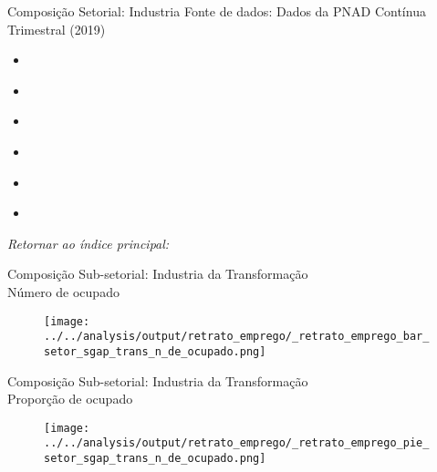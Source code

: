 \begin{frame}[label=_retrato_emprego_setor_sgap_trans]{Composição Setorial: Industria}
{\footnotesize Fonte de dados: Dados da PNAD Contínua Trimestral (2019)}

\begin{itemize}
\item{
	\hyperlink{_retrato_emprego_bar_setor_sgap_trans_n_de_ocupado}{}
	}
\item{
	\hyperlink{_retrato_emprego_pie_setor_sgap_trans_n_de_ocupado}{}
	} 
\item{
	\hyperlink{_retrato_emprego_bar_setor_sgap_trans_n_de_formal}{}
	} 
\item{
	\hyperlink{_retrato_emprego_pie_setor_sgap_trans_n_de_formal}{}
	} 
\item{
	\hyperlink{_retrato_emprego_bar_setor_sgap_trans_n_de_informal}{}
	} 	
\item{	
	\hyperlink{_retrato_emprego_pie_setor_sgap_trans_n_de_informal}{}
	} 		

\end{itemize}
\begin{small}
\textit{Retornar ao índice principal: \hyperlink{indice_principal}{} }
\end{small}
\end{frame}


\begin{frame}[label=_retrato_emprego_bar_setor_sgap_trans_n_de_ocupado]{{\small Composição Sub-setorial: Industria da Transformação} \\  Número de ocupado}
\textit{\hyperlink{_retrato_emprego_setor_sgap_trans}{}}
\begin{figure}
  \centering
  \texttt{[image: ../../analysis/output/retrato\_emprego/\_retrato\_emprego\_bar\_setor\_sgap\_trans\_n\_de\_ocupado.png]}
  \caption{}
  \label{fig:_retrato_emprego_bar_setor_sgap_trans_n_de_ocupado}
\end{figure}
\end{frame}


\begin{frame}[label=_retrato_emprego_pie_setor_sgap_trans_n_de_ocupado]{{\small Composição Sub-setorial: Industria da Transformação} \\  Proporção de ocupado}
\textit{\hyperlink{_retrato_emprego_setor_sgap_trans}{}}
\begin{figure}
  \centering
  \texttt{[image: ../../analysis/output/retrato\_emprego/\_retrato\_emprego\_pie\_setor\_sgap\_trans\_n\_de\_ocupado.png]}
  \caption{}
  \label{fig:_retrato_emprego_pie_setor_sgap_trans_n_de_ocupado}
\end{figure}
\end{frame}



